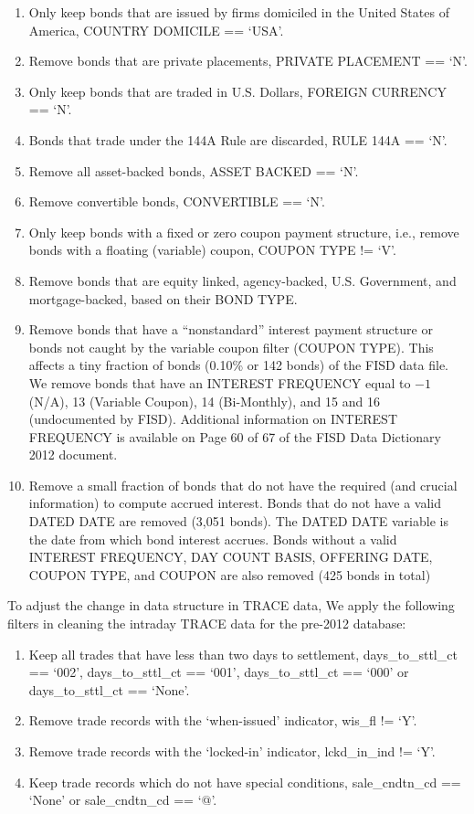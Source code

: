 \documentclass[12pt]{article}
\begin{document}
\begin{enumerate}
    \item Only keep bonds that are issued by firms domiciled in the United States of America, COUNTRY DOMICILE
    == ‘USA’.
    \item Remove bonds that are private placements, PRIVATE PLACEMENT == ‘N’.
    \item Only keep bonds that are traded in U.S. Dollars, FOREIGN CURRENCY == ‘N’.
    \item Bonds that trade under the 144A Rule are discarded, RULE 144A == ‘N’.
    \item Remove all asset-backed bonds, ASSET BACKED == ‘N’.
    \item Remove convertible bonds, CONVERTIBLE == ‘N’.
    \item Only keep bonds with a fixed or zero coupon payment structure, i.e., remove bonds with a floating (variable) coupon, COUPON TYPE != ‘V’.
    \item Remove bonds that are equity linked, agency-backed, U.S. Government, and mortgage-backed, based on their BOND TYPE.
    \item Remove bonds that have a “nonstandard” interest payment structure or bonds not caught by the variable coupon filter (COUPON TYPE). This affects a tiny fraction of bonds (0.10\% or 142 bonds) of the FISD data file. We remove bonds that have an INTEREST FREQUENCY equal to $-1$ (N/A), 13 (Variable Coupon), 14 (Bi-Monthly), and 15 and 16 (undocumented by FISD). Additional information on INTEREST FREQUENCY is available on Page 60 of 67 of the FISD Data Dictionary 2012 document.
    \item Remove a small fraction of bonds that do not have the required (and crucial information) to compute accrued interest. Bonds that do not have a valid DATED DATE are removed (3,051 bonds). The DATED DATE variable is the date from which bond interest accrues. Bonds without a valid INTEREST FREQUENCY, DAY COUNT BASIS, OFFERING DATE, COUPON TYPE, and COUPON are also removed (425 bonds in total)
\end{enumerate}

To adjust the change in data structure in TRACE data, We apply the following filters in cleaning the intraday TRACE data for the pre-2012 database:

\begin{enumerate}
    \item Keep all trades that have less than two days to settlement, days\_to\_sttl\_ct == ‘002’, days\_to\_sttl\_ct == ‘001’, days\_to\_sttl\_ct == ‘000’ or days\_to\_sttl\_ct == ‘None’.
    \item Remove trade records with the ‘when-issued’ indicator, wis\_fl != ‘Y’.
    \item Remove trade records with the ‘locked-in’ indicator, lckd\_in\_ind != ‘Y’.
    \item Keep trade records which do not have special conditions, sale\_cndtn\_cd == ‘None’ or sale\_cndtn\_cd == ‘@’.
\end{enumerate}
\end{document}
